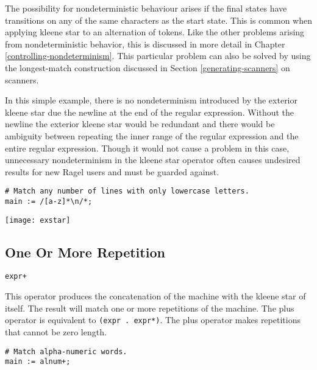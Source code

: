 \documentclass[letterpaper,11pt,oneside]{book}
\newcommand{\verbspace}{\vspace{10pt}}
\newcommand{\graphspace}{\vspace{10pt}}
\newenvironment{inline_code}{\def\baselinestretch{1}\vspace{12pt}\small}{}
\begin{document}
The possibility for nondeterministic behaviour arises if the final states have
transitions on any of the same characters as the start state.  This is common
when applying kleene star to an alternation of tokens. Like the other problems
arising from nondeterministic behavior, this is discussed in more detail in Chapter
\ref{controlling-nondeterminism}. This particular problem can also be solved
by using the longest-match construction discussed in Section 
\ref{generating-scanners} on scanners.

In this simple
example, there is no nondeterminism introduced by the exterior kleene star due
the newline at the end of the regular expression. Without the newline the
exterior kleene star would be redundant and there would be ambiguity between
repeating the inner range of the regular expression and the entire regular
expression. Though it would not cause a problem in this case, unnecessary
nondeterminism in the kleene star operator often causes undesired results for
new Ragel users and must be guarded against.

\begin{inline_code}
\begin{verbatim}
# Match any number of lines with only lowercase letters.
main := /[a-z]*\n/*;
\end{verbatim}
\end{inline_code}

\graphspace
\begin{center}
\texttt{[image: exstar]}
\end{center}
\graphspace

\subsection{One Or More Repetition}

\verb|expr+|
\verbspace

This operator produces the concatenation of the machine with the kleene star of
itself. The result will match one or more repetitions of the machine. The plus
operator is equivalent to \verb|(expr . expr*)|.  The plus operator makes
repetitions that cannot be zero length.

\begin{inline_code}
\begin{verbatim}
# Match alpha-numeric words.
main := alnum+;
\end{verbatim}
\end{inline_code}
\end{document}
